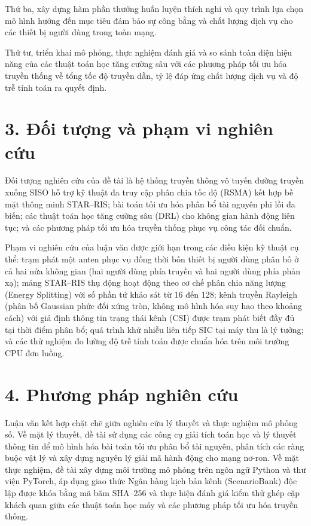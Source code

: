Thứ ba, xây dựng hàm phần thưởng huấn luyện thích nghi và quy trình lựa chọn mô hình hướng đến mục tiêu
đảm bảo sự công bằng và chất lượng dịch vụ cho các thiết bị người dùng trong toàn mạng.

Thứ tư, triển khai mô phỏng, thực nghiệm đánh giá và so sánh toàn diện hiệu năng của các thuật toán học
tăng cường sâu với các phương pháp tối ưu hóa truyền thống về tổng tốc độ truyền dẫn, tỷ lệ đáp ứng chất
lượng dịch vụ và độ trễ tính toán ra quyết định.

\section*{3. Đối tượng và phạm vi nghiên cứu}

Đối tượng nghiên cứu của đề tài là hệ thống truyền thông vô tuyến đường truyền xuống SISO hỗ trợ kỹ thuật
đa truy cập phân chia tốc độ (RSMA) kết hợp bề mặt thông minh STAR--RIS; bài toán tối ưu hóa phân bổ tài
nguyên phi lồi đa biến; các thuật toán học tăng cường sâu (DRL) cho không gian hành động liên tục; và
các phương pháp tối ưu hóa truyền thống phục vụ công tác đối chuẩn.

Phạm vi nghiên cứu của luận văn được giới hạn trong các điều kiện kỹ thuật cụ thể: trạm phát một anten
phục vụ đồng thời bốn thiết bị người dùng phân bố ở cả hai nửa không gian (hai người dùng phía truyền và
hai người dùng phía phản xạ); mảng STAR--RIS thụ động hoạt động theo cơ chế phân chia năng lượng (Energy
Splitting) với số phần tử khảo sát từ 16 đến 128; kênh truyền Rayleigh (phân bố Gaussian phức đối xứng
tròn, không mô hình hóa suy hao theo khoảng cách) với giả định thông tin trạng thái kênh (CSI) được trạm
phát biết đầy đủ tại thời điểm phân bổ; quá trình khử nhiễu liên tiếp SIC tại máy thu là lý tưởng; và
các thử nghiệm đo lường độ trễ tính toán được chuẩn hóa trên môi trường CPU đơn luồng.

\section*{4. Phương pháp nghiên cứu}

Luận văn kết hợp chặt chẽ giữa nghiên cứu lý thuyết và thực nghiệm mô phỏng số. Về mặt lý thuyết, đề tài
sử dụng các công cụ giải tích toán học và lý thuyết thông tin để mô hình hóa bài toán tối ưu phân bổ tài
nguyên, phân tích các ràng buộc vật lý và xây dựng nguyên lý giải mã hành động cho mạng nơ-ron. Về mặt
thực nghiệm, đề tài xây dựng môi trường mô phỏng trên ngôn ngữ Python và thư viện PyTorch, áp dụng giao
thức Ngân hàng kịch bản kênh (ScenarioBank) độc lập được khóa bằng mã băm SHA--256 và thực hiện đánh giá
kiểm thử ghép cặp khách quan giữa các thuật toán học máy và các phương pháp tối ưu hóa truyền thống.

